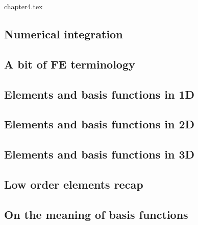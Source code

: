 \begin{flushright} {\tiny {\color{gray} chapter4.tex}} \end{flushright}

\subsection{Numerical integration} \label{sec:quadrature} %
\newpage
\subsection{A bit of FE terminology}  %
\newpage
\subsection{Elements and basis functions in 1D}\label{sec:elts1D}  %
\newpage
\subsection{Elements and basis functions in 2D}\label{sec:shpfct2d}  %
\newpage
\subsection{Elements and basis functions in 3D}  %
\subsection{Low order elements recap}  %
\newpage
\subsection{On the meaning of basis functions}  %

